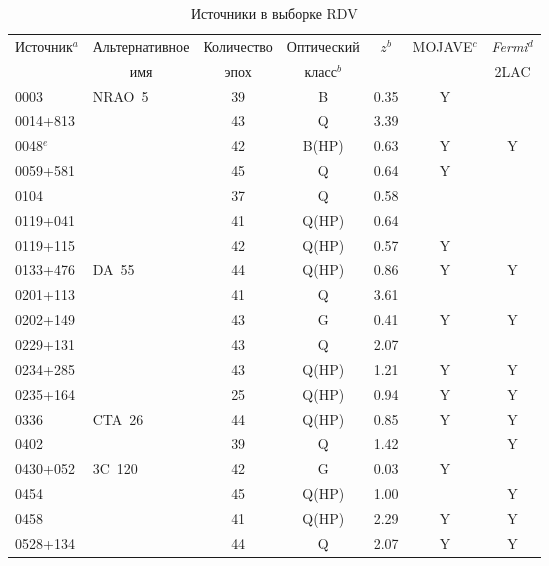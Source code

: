 \begin{table}[htb!]
\tiny
\caption{Источники в выборке RDV}
\label{tab:rdv_sources}
\centering
\begin{SingleSpace}
\begin{tabular}{l l c c c c c}
\toprule
\multicolumn{1}{c}{Источник$^{a}$} & \multicolumn{1}{c}{Альтернативное} & Количество & Оптический &
$z^{b}$ & MOJAVE$^{c}$ & \emph{Fermi}$^{d}$ \\
 & \multicolumn{1}{c}{имя} & эпох & класс$^{b}$ & &  & 2LAC \\
\midrule
0003\textminus066       & NRAO~5    & 39 & B     & 0.35      & Y &   \\
0014+813         &           & 43 & Q     & 3.39      &   &   \\
0048\textminus097$^{e}$ &           & 42 & B(HP) & 0.63      & Y & Y \\
0059+581         &           & 45 & Q     & 0.64      & Y &   \\
0104\textminus408       &           & 37 & Q     & 0.58      &   &   \\
0119+041         &           & 41 & Q(HP) & 0.64      &   &   \\
0119+115         &           & 42 & Q(HP) & 0.57      & Y &   \\
0133+476         & DA~55     & 44 & Q(HP) & 0.86      & Y & Y \\
0201+113         &           & 41 & Q     & 3.61      &   &   \\
0202+149         &           & 43 & G     & 0.41      & Y & Y \\
0229+131         &           & 43 & Q     & 2.07      &   &   \\
0234+285         &           & 43 & Q(HP) & 1.21      & Y & Y \\
0235+164         &           & 25 & Q(HP) & 0.94      & Y & Y \\
0336\textminus019       & CTA~26    & 44 & Q(HP) & 0.85      & Y & Y \\
0402\textminus362       &           & 39 & Q     & 1.42      &   & Y \\
0430+052         & 3C~120    & 42 & G     & 0.03      & Y &   \\
0454\textminus234       &           & 45 & Q(HP) & 1.00      &   & Y \\
0458\textminus020       &           & 41 & Q(HP) & 2.29      & Y & Y \\
0528+134         &           & 44 & Q     & 2.07      & Y & Y \\

\end{tabular}
\end{SingleSpace}
\end{table}
